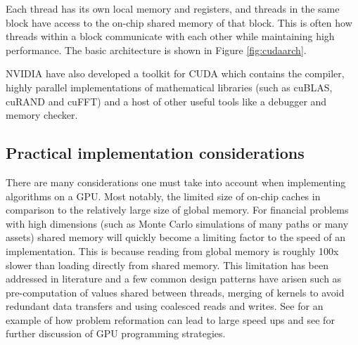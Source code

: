 Each thread has its own local memory and registers, and threads in the same block have access to the on-chip shared memory of that block. This is often how threads within a block communicate with each other while maintaining high performance. The basic architecture is shown in Figure \ref{fig:cudaarch}.

NVIDIA have also developed a toolkit for CUDA \cite{cudatoolkitdocumentation} which contains the compiler, highly parallel implementations of mathematical libraries (such as cuBLAS, cuRAND and cuFFT) and a host of other useful tools like a debugger and memory checker.

\subsection{Practical implementation considerations}
There are many considerations one must take into account when implementing algorithms on a GPU. Most notably, the limited size of on-chip caches in comparison to the relatively large size of global memory. For financial problems with high dimensions (such as Monte Carlo simulations of many paths or many assets) shared memory will quickly become a limiting factor to the speed of an implementation. This is because reading from global memory is roughly 100x slower than loading directly from shared memory. This limitation has been addressed in literature and a few common design patterns have arisen such as pre-computation of values shared between threads, merging of kernels to avoid redundant data transfers and using coalesced reads and writes. See \cite{dixon2012monte} for an example of how problem reformation can lead to large speed ups and see \cite{BrodtkorbGPU} for further discussion of GPU programming strategies.